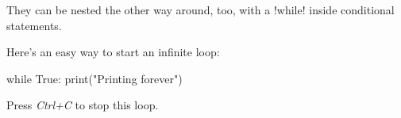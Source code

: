 \documentclass[11pt]{cselabheader}
\begin{document}
They can be nested the other way around, too, with a
\pythoninline!while! inside conditional statements.

Here's an easy way to start an infinite loop:
\begin{python3code}
while True:
    print("Printing forever")
\end{python3code}

Press \emph{Ctrl+C} to stop this loop.

%
%
%
%
%
%
%
%
%
%
%
%
%
%
%
\end{document}
